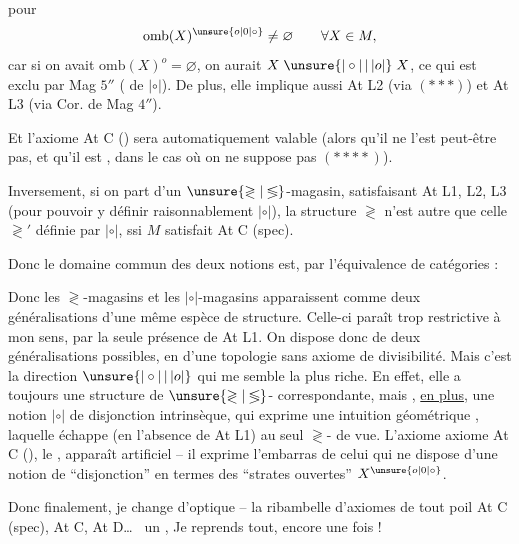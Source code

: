 pour
\[
\mathrm{omb}(X)^{\unsure{o|0|\circ}}\ne\varnothing\qquad\forall X\in M,
\]
car si on avait $\mathrm{omb}(X)^o=\varnothing$, on aurait $X\mathrel{\unsure{|\circ|\,|\,|o|}}X$, ce qui est exclu par Mag $5''$ ( de $|\circ|$). De plus, elle implique aussi At L2 (via $(***)$) et At L3 (via  Cor. de Mag $4''$).

Et l'axiome At C () sera automatiquement valable (alors qu'il ne l'est peut-être pas, et qu'il est , dans le cas où on ne suppose pas $(****)$).

Inversement, si on part d'un $\unsure{\gtrless|\lessgtr}$-magasin, satisfaisant At L1, L2, L3 (pour pouvoir y définir raisonnablement $|\circ|$), la structure $\gtrless$ n'est autre que celle $\gtrless'$ définie par $|\circ|$, ssi $M$ satisfait At C (spec).

Donc le domaine commun des deux notions est,  par l'équivalence de catégories :

Donc les $\gtrless$-magasins et les $|\circ|$-magasins apparaissent comme deux  généralisations d'une même espèce de structure. Celle-ci paraît trop restrictive à mon sens, par la seule présence de At L1.
On dispose donc de deux généralisations possibles, en  d'une topologie sans axiome de divisibilité. Mais c'est la direction $\unsure{|\circ|\,|\,|o|}$ qui me semble la plus riche. En effet, elle a toujours une structure de $\unsure{\gtrless|\lessgtr}$- correspondante, mais , \uline{en plus}, une notion $|\circ|$ de disjonction intrinsèque, qui exprime une intuition géométrique , laquelle échappe (en l'absence de At L1) au seul $\gtrless$- de vue. L'axiome axiome At C (),  le , apparaît artificiel -- il exprime l'embarras de celui qui ne dispose d'une notion de ``disjonction'' en termes des  ``strates ouvertes'' $X^{\unsure{o|0|\circ}}$.

Donc finalement, je change d'optique -- la ribambelle d'axiomes de tout poil At C (spec), At C, At D\ldots\   un  , Je reprends
tout, encore une fois !

